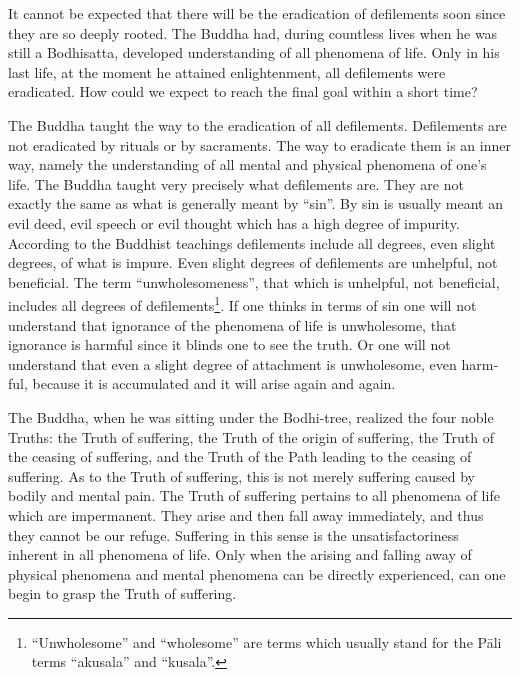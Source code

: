 \documentclass{book}
\begin{document}
It cannot be expected that there will be the eradication of defilements
soon since they are so deeply rooted. The Buddha had, during countless
lives when he was still a Bodhisatta, developed understanding of all
phenomena of life. Only in his last life, at the moment he attained
enlightenment, all defilements were eradicated. How could we expect to
reach the final goal within a short time?

The Buddha taught the way to the eradication of all defilements.
Defilements are not eradicated by rituals or by sacraments. The way to
eradicate them is an inner way, namely the understanding of all mental
and physical phenomena of one's life. The Buddha taught very precisely
what defilements are. They are not exactly the same as what is generally
meant by ``sin''. By sin is usually meant an evil deed, evil speech or
evil thought which has a high degree of impurity. According to the
Buddhist teachings defilements include all degrees, even slight degrees,
of what is impure. Even slight degrees of defilements are unhelpful, not
beneficial. The term ``unwholesomeness'', that which is unhelpful, not
beneficial, includes all degrees of defilements\footnote{``Unwholesome''
  and ``wholesome'' are terms which usually stand for the Pāli terms
  ``akusala'' and ``kusala''.}. If one thinks in terms of sin one will
not understand that ignorance of the phenomena of life is unwholesome,
that ignorance is harmful since it blinds one to see the truth. Or one
will not understand that even a slight degree of attachment is
unwholesome, even harm­ful, because it is accumulated and it will arise
again and again.

The Buddha, when he was sitting under the Bodhi-tree, realized the four
noble Truths: the Truth of suffering, the Truth of the origin of
suffering, the Truth of the ceasing of suffering, and the Truth of the
Path leading to the ceasing of suffering. As to the Truth of suffering,
this is not merely suffering caused by bodily and mental pain. The Truth
of suffering pertains to all phenomena of life which are imper­manent.
They arise and then fall away immediately, and thus they cannot be our
refuge. Suffering in this sense is the unsatisfactoriness inherent in
all phenomena of life. Only when the arising and falling away of
physical phenomena and mental phenomena can be directly experienced, can
one begin to grasp the Truth of suffering.
\end{document}
